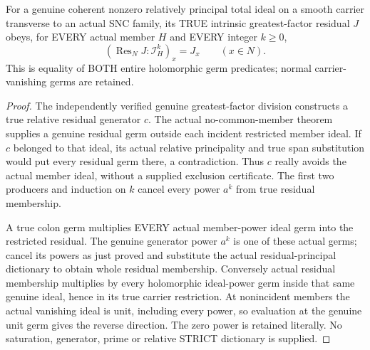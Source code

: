 \begin{theorem}
\label{hir:sharp-actual-residual-arbitrary-member-power-cancellation}
\leanok
For a genuine coherent nonzero relatively principal total ideal on a smooth
carrier transverse to an actual SNC family, its TRUE intrinsic greatest-factor
residual $J$ obeys, for EVERY actual member $H$ and EVERY integer $k\ge0$,
\[
 (\operatorname{Res}_N J:\mathcal I_H^k)_x=J_x
 \qquad(x\in N).
\]
This is equality of BOTH entire holomorphic germ predicates; normal
carrier-vanishing germs are retained.
\end{theorem}
\begin{proof}
The independently verified genuine greatest-factor division constructs a
true relative residual generator $c$. The actual no-common-member theorem
supplies a genuine residual germ outside each incident restricted member
ideal. If $c$ belonged to that ideal, its actual relative principality and
true span substitution would put every residual germ there, a contradiction.
Thus $c$ really avoids the actual member ideal, without a supplied exclusion
certificate. The first two producers and induction on $k$ cancel every
power $a^k$ from true residual membership.

A true colon germ multiplies EVERY actual member-power ideal germ into the
restricted residual. The genuine generator power $a^k$ is one of these
actual germs; cancel its powers as just proved and substitute the actual
residual-principal dictionary to obtain whole residual membership. Conversely
actual residual membership multiplies by every holomorphic ideal-power germ
inside that same genuine ideal, hence in its true carrier restriction.
At nonincident members the actual vanishing ideal is unit, including every
power, so evaluation at the genuine unit germ gives the reverse direction.
The zero power is retained literally. No saturation, generator, prime or
relative STRICT dictionary is supplied.
\end{proof}

